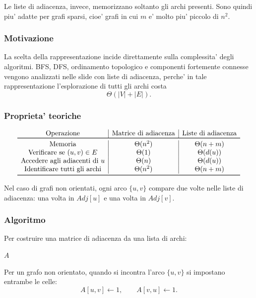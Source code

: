 Le liste di adiacenza, invece, memorizzano soltanto gli archi presenti. Sono quindi piu' adatte per grafi sparsi, cioe' grafi in cui $m$ e' molto piu' piccolo di $n^2$.

\subsubsection{Motivazione}
La scelta della rappresentazione incide direttamente sulla complessita' degli algoritmi. BFS, DFS, ordinamento topologico e componenti fortemente connesse vengono analizzati nelle slide con liste di adiacenza, perche' in tale rappresentazione l'esplorazione di tutti gli archi costa
\[
\Theta(|V|+|E|).
\]

\subsubsection{Proprieta' teoriche}
\[
\begin{array}{c|c|c}
\text{Operazione} & \text{Matrice di adiacenza} & \text{Liste di adiacenza} \\
\toprule
\text{Memoria} & \Theta(n^2) & \Theta(n+m) \\
\text{Verificare se }(u,v)\in E & \Theta(1) & \Theta(d(u)) \\
\text{Accedere agli adiacenti di }u & \Theta(n) & \Theta(d(u)) \\
\text{Identificare tutti gli archi} & \Theta(n^2) & \Theta(n+m) \\
\bottomrule
\end{array}
\]

Nel caso di grafi non orientati, ogni arco $\{u,v\}$ compare due volte nelle liste di adiacenza: una volta in $Adj[u]$ e una volta in $Adj[v]$.

\subsubsection{Algoritmo}
Per costruire una matrice di adiacenza da una lista di archi:
\begin{algorithm}[H]
	\caption{\textsc{CostruisciMatriceAdiacenza}$(V,E)$}
	\Return $A$\;
\end{algorithm}

Per un grafo non orientato, quando si incontra l'arco $\{u,v\}$ si impostano entrambe le celle:
\[
A[u,v]\gets 1,\qquad A[v,u]\gets 1.
\]

